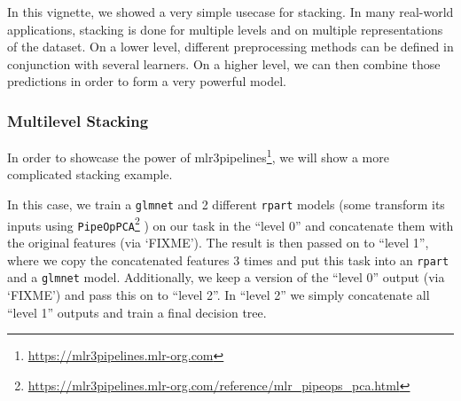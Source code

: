 \documentclass[12pt,]{scrbook}
\renewcommand{\href}[2]{#2\footnote{\url{#1}}}
\begin{document}
In this vignette, we showed a very simple usecase for stacking.
In many real-world applications, stacking is done for multiple levels and on multiple representations of the dataset.
On a lower level, different preprocessing methods can be defined in conjunction with several learners.
On a higher level, we can then combine those predictions in order to form a very powerful model.

\hypertarget{multilevel-stacking}{%
\subsubsection{Multilevel Stacking}\label{multilevel-stacking}}

In order to showcase the power of \href{https://mlr3pipelines.mlr-org.com}{mlr3pipelines}, we will show a more complicated stacking example.

In this case, we train a \texttt{glmnet} and 2 different \texttt{rpart} models (some transform its inputs using \href{https://mlr3pipelines.mlr-org.com/reference/mlr_pipeops_pca.html}{\texttt{PipeOpPCA}} ) on our task in the ``level 0'' and concatenate them with the original features (via `FIXME').
The result is then passed on to ``level 1'', where we copy the concatenated features 3 times and put this task into an \texttt{rpart} and a \texttt{glmnet} model.
Additionally, we keep a version of the ``level 0'' output (via `FIXME') and pass this on to ``level 2''.
In ``level 2'' we simply concatenate all ``level 1'' outputs and train a final decision tree.
\end{document}
